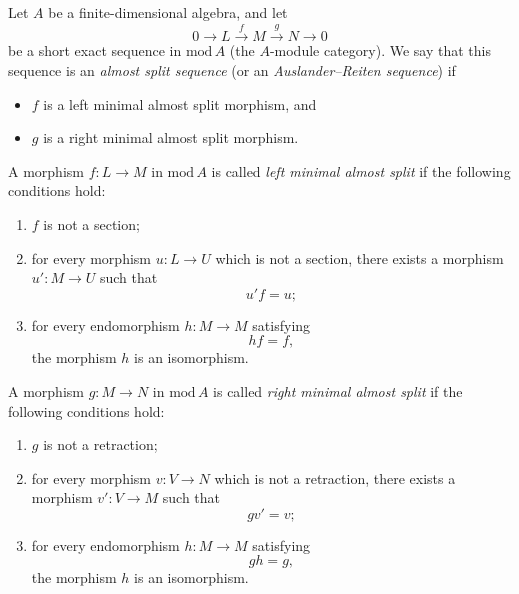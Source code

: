 \documentclass[11pt, a4paper]{report}
\begin{document}
\begin{definition}
    Let $A$ be a finite-dimensional algebra, and let
    \[
        0 \longrightarrow L \xrightarrow{\,f\,} M \xrightarrow{\,g\,} N \longrightarrow 0
    \]
    be a short exact sequence in $\mathrm{mod}\,A$ (the $A$-module category).
    We say that this sequence is an \emph{almost split sequence}
    (or an \emph{Auslander--Reiten sequence}) if
    \begin{itemize}
        \item $f$ is a left minimal almost split morphism, and
        \item $g$ is a right minimal almost split morphism.
    \end{itemize}
\end{definition}

\begin{definition}
    A morphism $f \colon L \to M$ in $\mathrm{mod}\,A$ is called
    \emph{left minimal almost split} if the following conditions hold:
    \begin{enumerate}
        \item $f$ is not a section;
        \item for every morphism $u \colon L \to U$ which is not a section,
              there exists a morphism $u' \colon M \to U$ such that
              \[
                  u' f = u;
              \]
        \item for every endomorphism $h \colon M \to M$ satisfying
              \[
                  h f = f,
              \]
              the morphism $h$ is an isomorphism.
    \end{enumerate}
\end{definition}

\begin{definition}
    A morphism $g \colon M \to N$ in $\mathrm{mod}\,A$ is called
    \emph{right minimal almost split} if the following conditions hold:
    \begin{enumerate}
        \item $g$ is not a retraction;
        \item for every morphism $v \colon V \to N$ which is not a retraction,
              there exists a morphism $v' \colon V \to M$ such that
              \[
                  g v' = v;
              \]
        \item for every endomorphism $h \colon M \to M$ satisfying
              \[
                  g h = g,
              \]
              the morphism $h$ is an isomorphism.
    \end{enumerate}
\end{definition}
\end{document}
